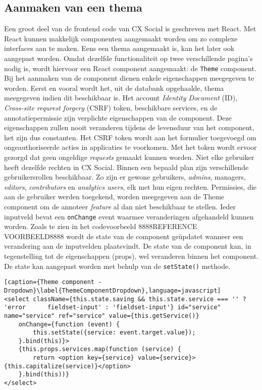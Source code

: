 \subsection{Aanmaken van een thema}
Een groot deel van de frontend code van CX Social is geschreven met React. Met React kunnen makkelijk componenten aangemaakt worden om zo complexe interfaces aan te maken. %
Eens een thema aangemaakt is, kan het later ook aangepast worden. Omdat dezelfde functionaliteit op twee verschillende pagina's nodig is, wordt hiervoor een React component aangemaakt: de \lstinline{Theme} component. Bij het aanmaken van de component dienen enkele eigenschappen meegegeven te worden. Eerst en vooral wordt het, uit de databank opgehaalde, thema meegegeven indien dit beschikbaar is. %
Het account \textit{Identity Document} (ID), \textit{Cross-site requrest forgery} (CSRF) token, beschikbare services, en de annotatiepermissie zijn verplichte eigenschappen van de component. Deze eigenschappen zullen nooit veranderen tijdens de levensduur van het component, het zijn dus constanten. Het CSRF token wordt aan het formulier toegevoegd om ongeauthoriseerde acties in applicaties te voorkomen. Met het token wordt ervoor gezorgd dat geen ongeldige \textit{requests} gemaakt kunnen worden. %
Niet elke gebruiker heeft dezelfde rechten in CX Social. Binnen een bepaald plan zijn verschillende gebruikersrollen beschikbaar. Zo zijn er gewone gebruikers, \textit{admins}, managers, \textit{editors}, \textit{contributors} en \textit{analytics users}, elk met hun eigen rechten. Permissies, die aan de gebruiker werden toegekend, worden meegegeven aan de Theme component om de annoteer \textit{feature} al dan niet beschikbaar te stellen. Ieder inputveld bevat een \lstinline{onChange} event waarmee veranderingen afgehandeld kunnen worden. Zoals te zien in het codevoorbeeld 8888REFERENCE VOORBEELD8888 wordt de state van de component ge\"{u}pdatet wanneer een verandering aan de inputvelden plaatsvindt. De state van de component kan, in tegenstelling tot de eigenschappen (props), wel veranderen binnen het component. De state kan aangepast worden met behulp van  de \lstinline{setState()} methode. 

\begin{lstlisting}[caption={Theme component - Dropdown}\label{ThemeComponentDropdown},language=javascript]
<select className={this.state.saving && this.state.service === '' ? 'error 		fieldset-input' : 'fieldset-input'} id="service" name="service" ref="service" value={this.getService()}
	onChange={function (event) {
		this.setState({service: event.target.value});
	}.bind(this)}>
	{this.props.services.map(function (service) {
		return <option key={service} value={service}>{this.capitalize(service)}</option>
	}.bind(this))}
</select>
\end{lstlisting}

